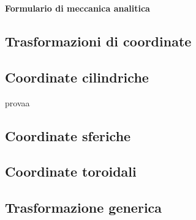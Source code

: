 \documentclass[11pt,landscape]{article}
\begin{document}
\raggedright
\footnotesize

\begin{center}
     \Large{\textbf{Formulario di meccanica analitica}} \\
\end{center}
\begin{multicols}{3}
\setlength{\premulticols}{1pt}
\setlength{\postmulticols}{1pt}
\setlength{\multicolsep}{1pt}
\setlength{\columnsep}{2pt}

\section{Trasformazioni di coordinate}
    \subsection{Coordinate cilindriche}
        provaa
    \subsection{Coordinate sferiche}

    \subsection{Coordinate toroidali}

    \subsection{Trasformazione generica}


\end{multicols}
\end{document}
